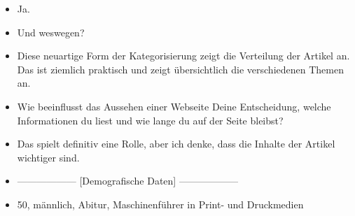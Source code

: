 {\begin{itemize}[]
            \item {} Ja.
            \item {} Und weswegen?
            \item {} Diese neuartige Form der Kategorisierung zeigt die Verteilung der Artikel an.
                  Das ist ziemlich praktisch und zeigt übersichtlich die verschiedenen Themen an.
            \item {} Wie beeinflusst das Aussehen einer Webseite Deine Entscheidung, welche Informationen du liest und wie lange du auf der Seite bleibst?
            \item {} Das spielt definitiv eine Rolle, aber ich denke, dass die Inhalte der Artikel wichtiger sind.
            \item {------------------} [Demografische Daten] {------------------}
            \item {} 50, männlich, Abitur, Maschinenführer in Print- und Druckmedien
      \end{itemize}}
\nolinenumbers
